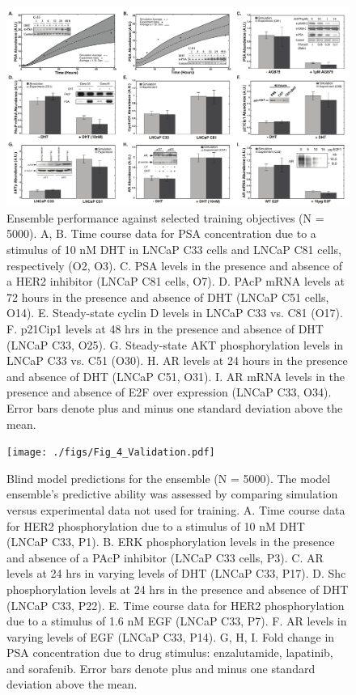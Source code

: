 \documentclass[12pt]{article}
\begin{document}
\begin{figure}\centering
\includegraphics[width=1.0\textwidth]{./figs/Fig_2_Training.pdf}
\caption{Ensemble performance against selected training objectives (N = 5000). A, B. Time course data for PSA concentration due to a stimulus of 10 nM DHT in LNCaP C33 cells and LNCaP C81 cells, respectively (O2, O3). C. PSA levels in the presence and absence of a HER2 inhibitor (LNCaP C81 cells, O7). D. PAcP mRNA levels at 72 hours in the presence and absence of DHT (LNCaP C51 cells, O14). E. Steady-state cyclin D levels in LNCaP C33 vs. C81 (O17). F. p21Cip1 levels at 48 hrs in the presence and absence of DHT (LNCaP C33, O25). G. Steady-state AKT phosphorylation levels in LNCaP C33 vs. C51 (O30). H. AR levels at 24 hours in the presence and absence of DHT (LNCaP C51, O31). I. AR mRNA levels in the presence and absence of E2F over expression (LNCaP C33, O34). Error bars denote plus and minus one standard deviation above the mean.}
\label{fg:Training}
\end{figure}

\clearpage

\begin{figure}\centering
\texttt{[image: ./figs/Fig\_4\_Validation.pdf]}
\caption{Blind model predictions for the ensemble (N = 5000). The model ensemble’s predictive ability was assessed by comparing simulation versus experimental data not used for training. A. Time course data for HER2 phosphorylation due to a stimulus of 10 nM DHT (LNCaP C33, P1). B. ERK phosphorylation levels in the presence and absence of a PAcP inhibitor (LNCaP C33 cells, P3). C. AR levels at 24 hrs in varying levels of DHT (LNCaP C33, P17). D. Shc phosphorylation levels at 24 hrs in the presence and absence of DHT (LNCaP C33, P22). E. Time course data for HER2 phosphorylation due to a stimulus of 1.6 nM EGF (LNCaP C33, P7). F. AR levels in varying levels of EGF (LNCaP C33, P14). G, H, I. Fold change in PSA concentration due to drug stimulus: enzalutamide, lapatinib, and sorafenib. Error bars denote plus and minus one standard deviation above the mean.}
\label{fg:Validation}
\end{figure}
\end{document}
